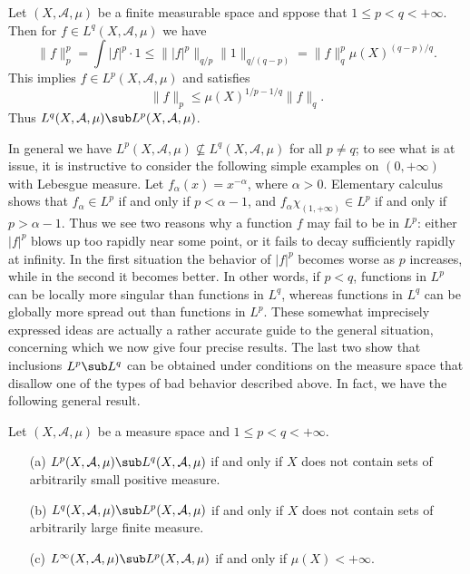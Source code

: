 \begin{example}
Let $(X,\mathcal{A},\mu)$ be a finite measurable space and sppose that $1\leq p<q<+\infty$. Then for $f\in L^{q}(X,\mathcal{A},\mu)$ we have
\[\|f\|_p^p=\int|f|^p\cdot 1\leq\||f|^p\|_{q/p}\|1\|_{q/(q-p)}=\|f\|_q^p\mu(X)^{(q-p)/q}.\]
This implies $f\in L^{p}(X,\mathcal{A},\mu)$ and satisfies
\[\|f\|_{p}\leq\mu(X)^{1/p-1/q}\|f\|_{q}.\]
Thus $L^{q}(X,\mathcal{A},\mu)\sub L^{p}(X,\mathcal{A},\mu)$.
\end{example}
In general we have $L^p(X,\mathcal{A},\mu)\not\subseteq L^q(X,\mathcal{A},\mu)$ for all $p\neq q$; to see what is at issue, it is instructive to consider the following simple examples on $(0,+\infty)$ with Lebesgue measure. Let $f_\alpha(x)=x^{-\alpha}$, where $\alpha>0$. Elementary calculus shows that $f_\alpha\in L^p$ if and only if $p<\alpha-1$, and $f_\alpha\chi_{(1,+\infty)}\in L^p$ if and only if $p>\alpha-1$. Thus we see two reasons why a function $f$ may fail to be in $L^p$: either $|f|^p$ blows up too rapidly near some point, or it fails to decay sufficiently rapidly at infinity. In the first situation the behavior of $|f|^p$ becomes worse as $p$ increases, while in the second it becomes better. In other words, if $p<q$, functions in $L^p$ can be locally more singular than functions in $L^q$, whereas functions in $L^q$ can be globally more spread out than functions in $L^p$. These somewhat imprecisely expressed ideas are actually a rather accurate guide to the general situation, concerning which we now give four precise results. The last two show that inclusions $L^p\sub L^q$ can be obtained under conditions on the measure space that disallow one of the types of bad behavior described above. In fact, we have the following general result.
\begin{proposition}\label{L^p and L^q inclusion iff}
Let $(X,\mathcal{A},\mu)$ be a measure space and $1\leq p<q<+\infty$.
\begin{itemize}
\item[(a)] $L^p(X,\mathcal{A},\mu)\sub L^q(X,\mathcal{A},\mu)$ if and only if $X$ does not contain sets of arbitrarily small positive measure.
\item[(b)] $L^q(X,\mathcal{A},\mu)\sub L^p(X,\mathcal{A},\mu)$ if and only if $X$ does not contain sets of arbitrarily large finite measure.
\item[(c)] $L^\infty(X,\mathcal{A},\mu)\sub L^p(X,\mathcal{A},\mu)$ if and only if $\mu(X)<+\infty$. 
\end{itemize} 
\end{proposition}
